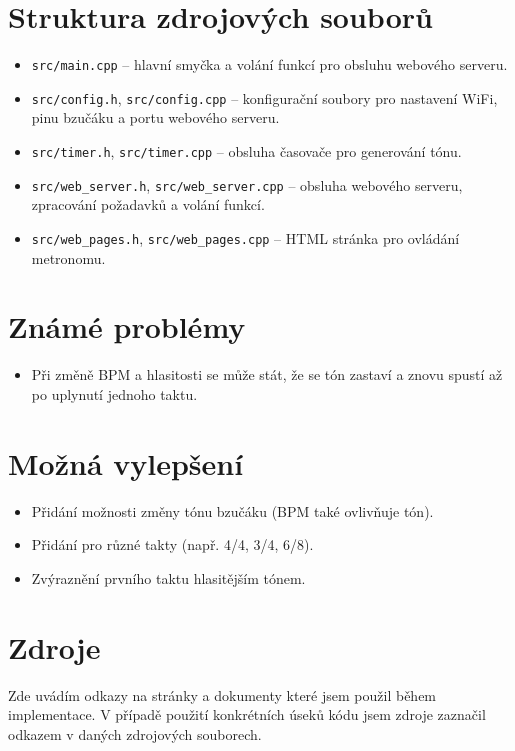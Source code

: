 \documentclass[a4paper, 11pt]{article}
\begin{document}
\section{Struktura zdrojových souborů}
\begin{itemize}
    \item \texttt{src/main.cpp} -- hlavní smyčka a volání funkcí pro obsluhu webového serveru.
    \item \texttt{src/config.h}, \texttt{src/config.cpp} -- konfigurační soubory pro nastavení WiFi, pinu bzučáku a portu webového serveru.
    \item \texttt{src/timer.h}, \texttt{src/timer.cpp} -- obsluha časovače pro generování tónu.
    \item \texttt{src/web\_server.h}, \texttt{src/web\_server.cpp} -- obsluha webového serveru, zpracování požadavků a volání funkcí.
    \item \texttt{src/web\_pages.h}, \texttt{src/web\_pages.cpp} -- HTML stránka pro ovládání metronomu.
\end{itemize}

\section{Známé problémy}
\begin{itemize}
    \item Při změně BPM a hlasitosti se může stát, že se tón zastaví a znovu spustí až po uplynutí jednoho taktu.
\end{itemize}

\section{Možná vylepšení}
\begin{itemize}
    \item Přidání možnosti změny tónu bzučáku (BPM také ovlivňuje tón).
    \item Přidání  pro různé takty (např. 4/4, 3/4, 6/8).
    \item Zvýraznění prvního taktu hlasitějším tónem.
\end{itemize}

\section{Zdroje}
Zde uvádím odkazy na stránky a dokumenty které jsem použil během implementace. V případě použití konkrétních úseků kódu jsem zdroje zaznačil odkazem v daných zdrojových souborech.



\end{document}
